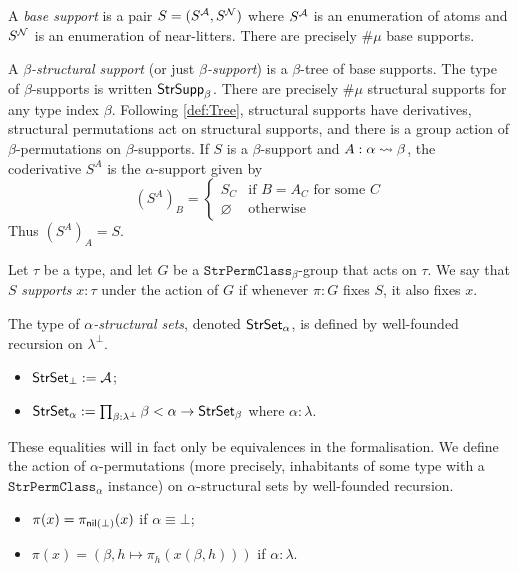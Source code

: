 \begin{definition}
  \label{def:BaseSupport}
  A \emph{base support} is a pair \( S = (S^{\mathcal A}, S^{\mathcal N}) \) where \( S^{\mathcal A} \) is an enumeration of atoms and \( S^{\mathcal N} \) is an enumeration of near-litters.
  There are precisely \( \#\mu \) base supports.
\end{definition}
\begin{definition}
  \label{def:StrSupport}
  A \emph{\( \beta \)-structural support} (or just \emph{\( \beta \)-support}) is a \( \beta \)-tree of base supports.
  The type of \( \beta \)-supports is written \( \mathsf{StrSupp}_\beta \).
  There are precisely \( \#\mu \) structural supports for any type index \( \beta \).
  Following \cref{def:Tree}, structural supports have derivatives, structural permutations act on structural supports, and there is a group action of \( \beta \)-permutations on \( \beta \)-supports.
  If \( S \) is a \( \beta \)-support and \( A : \alpha \rightsquigarrow \beta \), the coderivative \( S^A \) is the \( \alpha \)-support given by
  \[ (S^A)_B = \begin{cases}
    S_C & \text{if } B = A_C \text{ for some } C \\
    \varnothing & \text{otherwise}
  \end{cases} \]
  Thus \( (S^A)_A = S \).

  Let \( \tau \) be a type, and let \( G \) be a \( \texttt{StrPermClass}_\beta \)-group that acts on \( \tau \).
  We say that \( S \) \emph{supports} \( x : \tau \) under the action of \( G \) if whenever \( \pi : G \) fixes \( S \), it also fixes \( x \).
\end{definition}
\begin{definition}
  \label{def:StrSet}
  The type of \emph{\( \alpha \)-structural sets}, denoted \( \mathsf{StrSet}_\alpha \), is defined by well-founded recursion on \( \lambda^\bot \).
  \begin{itemize}
    \item \( \mathsf{StrSet}_\bot := {\mathcal A} \);
    \item \( \mathsf{StrSet}_\alpha := \prod_{\beta : \lambda^\bot} \beta < \alpha \to \mathsf{StrSet}_\beta \) where \( \alpha : \lambda \).
  \end{itemize}
  These equalities will in fact only be equivalences in the formalisation.
  We define the action of \( \alpha \)-permutations (more precisely, inhabitants of some type with a \( \texttt{StrPermClass}_\alpha \) instance) on \( \alpha \)-structural sets by well-founded recursion.
  \begin{itemize}
    \item \( \pi(x) = \pi_{\operatorname{\mathsf{nil}}(\bot)}(x) \) if \( \alpha \equiv \bot \);
    \item \( \pi(x) = (\beta, h \mapsto \pi_h(x(\beta, h))) \) if \( \alpha : \lambda \).
  \end{itemize}
\end{definition}

